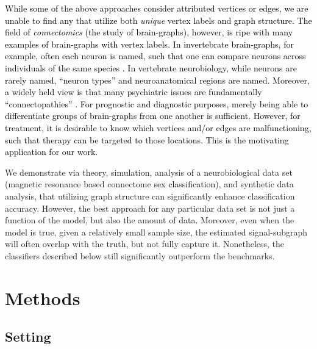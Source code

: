 \documentclass[10pt,journal,cspaper,compsoc]{IEEEtran}
\providecommand{\tk}[1]{\textcolor{black}{#1}}
\begin{document}
\tk{While some of the above approaches consider attributed vertices or edges, we are unable to find any that utilize both \emph{unique} vertex labels and graph structure. The field of \emph{connectomics} (the study of brain-graphs), however, is ripe with many examples of brain-graphs with vertex labels.  In invertebrate brain-graphs, for example, often each neuron is named, such that one can compare neurons across individuals of the same species \cite{North2007}.  In vertebrate neurobiology, while neurons are rarely named, ``neuron types''  \cite{Shepherd2007} and neuroanatomical regions \cite{Nolte2002} are named.  Moreover, a widely held view is that many psychiatric issues are fundamentally ``connectopathies'' \cite{LichtmanSanes08, Bassett2009}.  For prognostic and diagnostic purposes, merely being able to differentiate groups of brain-graphs from one another is sufficient.  However, for treatment, it is desirable to know which vertices and/or edges are malfunctioning, such that therapy can be targeted to those locations. This is the motivating application for our work.}

We demonstrate via theory, simulation, analysis of a neurobiological data set (magnetic resonance based connectome \tk{sex classification}), and synthetic data analysis, that utilizing graph structure can significantly enhance classification accuracy.  However, the best approach for any particular data set is not just a function of the model, but also the amount of data.  Moreover, even when the model is true, given a relatively small sample size, the estimated signal-subgraph will often overlap with the truth, but not fully capture it.  Nonetheless, the classifiers described below still significantly outperform the benchmarks.


\section{Methods} %
\label{sec:methods}




\subsection{Setting}
\end{document}
